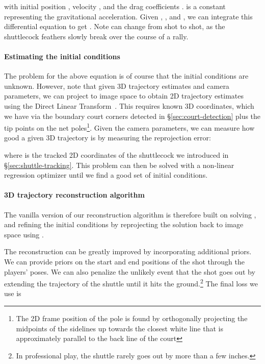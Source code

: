 with initial position , velocity , and the drag coefficients .  is a constant representing the gravitational acceleration. Given , , and , we can integrate this differential equation to get . Note  can change from shot to shot, as the shuttlecock feathers slowly break over the course of a rally. 

\paragraph{Estimating the initial conditions}
The problem for the above equation is of course that the initial conditions are unknown. However, note that given 3D trajectory estimates and camera parameters, we can project  to image space to obtain 2D trajectory estimates  using the Direct Linear Transform~\cite{abdel2015direct}. This requires  known 3D coordinates, which we have via the  boundary court corners detected in \S\ref{sec:court-detection} plus the  tip points on the net poles\footnote{The 2D frame position of the pole is found by orthogonally projecting the midpoints of the sidelines up towards the closest white line that is approximately parallel to the back line of the court}. Given the camera parameters, we can measure how good a given 3D trajectory is by measuring the reprojection error:

where  is the tracked 2D coordinates of the shuttlecock we introduced in \S\ref{sec:shuttle-tracking}. This problem can then be solved with a non-linear regression optimizer until we find a good set of initial conditions.

\paragraph{3D trajectory reconstruction algorithm}

The vanilla version of our reconstruction algorithm is therefore built on solving , and refining the initial conditions by reprojecting the solution back to image space using . 

The reconstruction can be greatly improved by incorporating additional priors. We can provide priors on the start and end positions of the shot through the players' poses. We can also penalize the unlikely event that the shot goes out by extending the trajectory of the shuttle until it hits the ground.\footnote{In professional play, the shuttle rarely goes out by more than a few inches.} The final loss we use is


